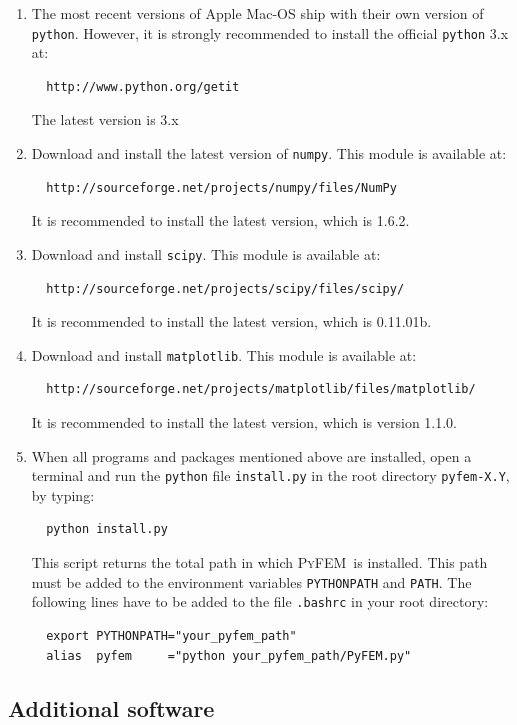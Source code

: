 \documentclass{article}
\newcommand{\progname}{\textsc{PyFEM}}
\begin{document}
\begin{enumerate}
\item The most recent versions of Apple Mac-OS ship with their own version of \texttt{python}. However, it is 
strongly recommended to install the official \texttt{python} 3.x at: 
\begin{verbatim}
  http://www.python.org/getit
\end{verbatim} 
The latest version is 3.x
\item Download and install the latest version of \texttt{numpy}.
This module is available at:
\begin{verbatim}
  http://sourceforge.net/projects/numpy/files/NumPy
\end{verbatim}
It is recommended to install the latest version, which is 1.6.2.
\item Download and install \texttt{scipy}.
This module is available at:
\begin{verbatim}
  http://sourceforge.net/projects/scipy/files/scipy/
\end{verbatim}
It is recommended to install the latest version, which is 0.11.01b.
\item Download and install \texttt{matplotlib}.
This module is available at:
\begin{verbatim}
  http://sourceforge.net/projects/matplotlib/files/matplotlib/
\end{verbatim}
It is recommended to install the latest version, which is version 1.1.0.
\item When all programs and packages mentioned above are installed, open a terminal and run 
the \texttt{python} file \texttt{install.py} in the root directory \texttt{pyfem-X.Y}, by typing:
\begin{verbatim}
  python install.py
\end{verbatim}
This script returns the total path in which \progname~is installed. This path must be 
added to the environment variables \texttt{PYTHONPATH} and \texttt{PATH}. The following lines 
have to be added to the file \texttt{.bashrc} in your root directory:
\begin{verbatim}
  export PYTHONPATH="your_pyfem_path"
  alias  pyfem     ="python your_pyfem_path/PyFEM.py"
\end{verbatim}
\end{enumerate}

\subsection{Additional software}
\end{document}
